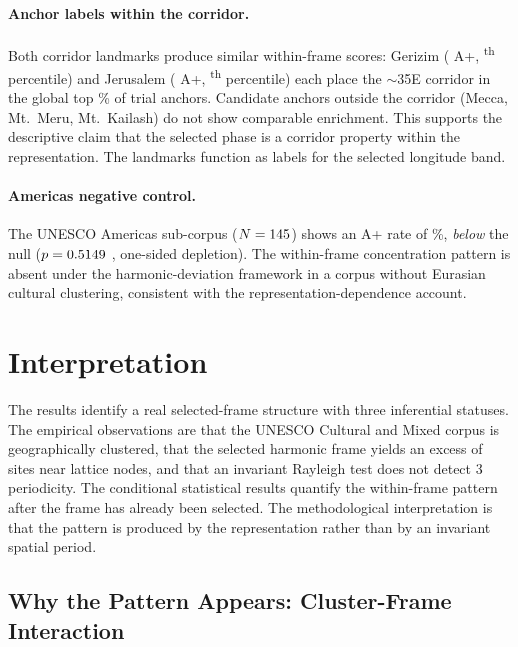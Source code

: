 \documentclass[12pt,a4paper]{article}
\begin{document}
\paragraph{Anchor labels within the corridor.}
Both corridor landmarks produce similar within-frame scores: Gerizim
(\GerizimSweepAp{} A+, \anchorSweepPctile\textsuperscript{th} percentile)
and Jerusalem (\JerusalemSweepAp{} A+,
\JerusalemSweepPctile\textsuperscript{th} percentile) each place the
$\sim$35\textdegree{}E corridor in the global top \anchorSweepTopPct\% of
\anchorSweepNanchors{} trial anchors. Candidate anchors outside the corridor
(Mecca, Mt.~Meru, Mt.~Kailash) do not show comparable enrichment. This
supports the descriptive claim that the selected phase is a corridor property
within the representation. The landmarks function as labels for the selected
longitude band.

\paragraph{Americas negative control.}
The UNESCO Americas sub-corpus ($N = 145$) shows an A+ rate of
\AmericasApRate\%, \emph{below} the \NullRateAp{} null
($p = 0.5149$ \AmericasOneSidedStar{}, one-sided depletion).
The within-frame concentration pattern is absent under the harmonic-deviation
framework in a corpus without Eurasian cultural clustering, consistent with
the representation-dependence account.

\section{Interpretation}
\label{sec:interpretation}

The results identify a real selected-frame structure with three inferential
statuses. The empirical
observations are that the UNESCO Cultural and Mixed corpus is geographically
clustered, that the selected harmonic frame yields an excess of sites near
lattice nodes, and that an invariant Rayleigh test does not detect
3\textdegree{} periodicity. The conditional statistical results quantify the
within-frame pattern after the frame has already been selected. The
methodological interpretation is that the pattern is produced by the
representation rather than by an invariant spatial period.

\subsection{Why the Pattern Appears: Cluster-Frame Interaction}
\end{document}

